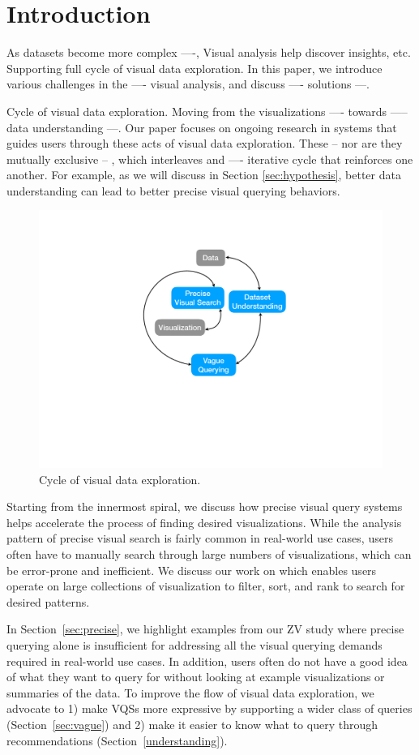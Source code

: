 \section{Introduction}
\par As datasets become more complex ----, 
Visual analysis help discover insights, etc.
Supporting full cycle of visual data exploration. 
In this paper, we introduce various challenges in the ---- visual analysis, and discuss ---- solutions ---.
\par Cycle of visual data exploration. Moving from the visualizations ---- towards ----- data understanding ---. Our paper focuses on ongoing research in systems that guides users through these acts of visual data exploration. These -- nor are they mutually exclusive -- , which interleaves and ---- iterative cycle that reinforces one another. For example, as we will discuss in Section \ref{sec:hypothesis}, better data understanding can lead to better precise visual querying behaviors.
\begin{figure}[h!]
\label{fig:cycle}
\centering
\includegraphics[width=0.4\linewidth]{figures/cycle.pdf}
\caption{Cycle of visual data exploration.}
\end{figure}
\par Starting from the innermost spiral, we discuss how precise visual query systems helps accelerate the process of finding desired visualizations. While the analysis pattern of precise visual search is fairly common in real-world use cases, users often have to manually search through large numbers of visualizations, which can be error-prone and inefficient. We discuss our work on \zv which enables users operate on large collections of visualization to filter, sort, and rank to search for desired patterns.
\par In Section~\ref{sec:precise}, we highlight examples from our ZV study where precise querying alone is insufficient for addressing all the visual querying demands required in real-world use cases. In addition, users often do not have a good idea of what they want to query for without looking at example visualizations or summaries of the data. To improve the flow of visual data exploration, we advocate to 1) make VQSs more expressive by supporting a wider class of queries (Section~\ref{sec:vague}) and 2) make it easier to know what to query through recommendations (Section~\ref{understanding}).

